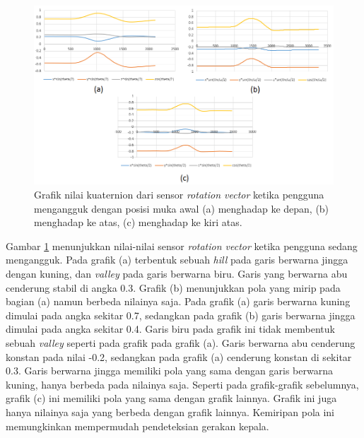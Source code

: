 \begin{figure}[htbp]
\centering
\includegraphics[scale=0.6]{Gambar/grafik-sensor-rot-vector-mengangguk.png}
\caption{Grafik nilai kuaternion dari sensor \textit{rotation vector} ketika pengguna mengangguk dengan posisi muka awal (a) menghadap ke depan, (b) menghadap ke atas, (c) menghadap ke kiri atas.} 
\label{fig:grafik-sensor-rot-vector-mengangguk}
\end{figure}

Gambar \ref{fig:grafik-sensor-rot-vector-mengangguk} menunjukkan nilai-nilai sensor \textit{rotation vector} ketika pengguna sedang mengangguk. Pada grafik (a) terbentuk sebuah \textit{hill} pada garis berwarna jingga dengan kuning, dan \textit{valley} pada garis berwarna biru. Garis yang berwarna abu cenderung stabil di angka 0.3. Grafik (b) menunjukkan pola yang mirip pada bagian (a) namun berbeda nilainya saja. Pada grafik (a) garis berwarna kuning dimulai pada angka sekitar 0.7, sedangkan pada grafik (b) garis berwarna jingga dimulai pada angka sekitar 0.4. Garis biru pada grafik ini tidak membentuk sebuah \textit{valley} seperti  pada grafik pada grafik (a). Garis berwarna abu cenderung konstan pada nilai -0.2, sedangkan pada grafik (a) cenderung konstan di sekitar 0.3. Garis berwarna jingga memiliki pola yang sama dengan garis berwarna kuning, hanya berbeda pada nilainya saja. Seperti pada grafik-grafik sebelumnya, grafik (c) ini memiliki pola yang sama dengan grafik lainnya. Grafik ini juga hanya nilainya saja yang berbeda dengan grafik lainnya. Kemiripan pola ini memungkinkan mempermudah pendeteksian gerakan kepala. 

